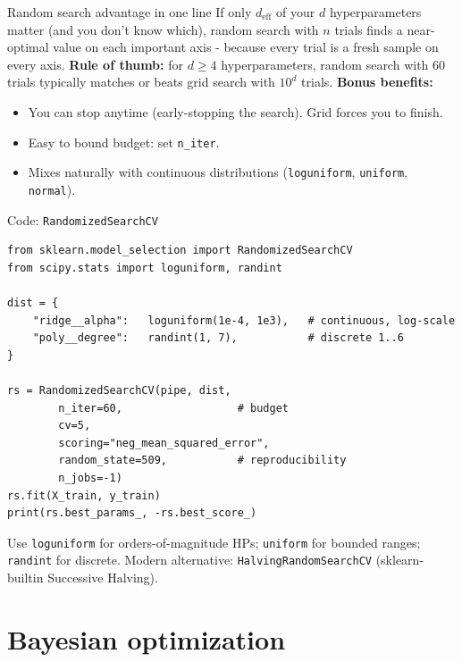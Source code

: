 \documentclass[aspectratio=169]{beamer}
\begin{document}
\begin{frame}{Random search advantage in one line}
  If only $d_{\text{eff}}$ of your $d$ hyperparameters matter (and you don't know which), random search with $n$ trials finds a near-optimal value on each important axis - because every trial is a fresh sample on every axis.
  \vfill
  \textbf{Rule of thumb:} for $d \geq 4$ hyperparameters, random search with $60$ trials typically matches or beats grid search with $10^d$ trials.
  \vfill
  \textbf{Bonus benefits:}
  \begin{itemize}
    \item You can stop anytime (early-stopping the search). Grid forces you to finish.
    \item Easy to bound budget: set \texttt{n\_iter}.
    \item Mixes naturally with continuous distributions (\texttt{loguniform}, \texttt{uniform}, \texttt{normal}).
  \end{itemize}
\end{frame}

\begin{frame}[fragile]{Code: \texttt{RandomizedSearchCV}}
\begin{lstlisting}
from sklearn.model_selection import RandomizedSearchCV
from scipy.stats import loguniform, randint

dist = {
    "ridge__alpha":   loguniform(1e-4, 1e3),   # continuous, log-scale
    "poly__degree":   randint(1, 7),           # discrete 1..6
}

rs = RandomizedSearchCV(pipe, dist,
        n_iter=60,                  # budget
        cv=5,
        scoring="neg_mean_squared_error",
        random_state=509,           # reproducibility
        n_jobs=-1)
rs.fit(X_train, y_train)
print(rs.best_params_, -rs.best_score_)
\end{lstlisting}
  \vfill
  \scriptsize Use \texttt{loguniform} for orders-of-magnitude HPs; \texttt{uniform} for bounded ranges; \texttt{randint} for discrete. Modern alternative: \texttt{HalvingRandomSearchCV} (sklearn-builtin Successive Halving).
\end{frame}

\section{Bayesian optimization}
\end{document}
